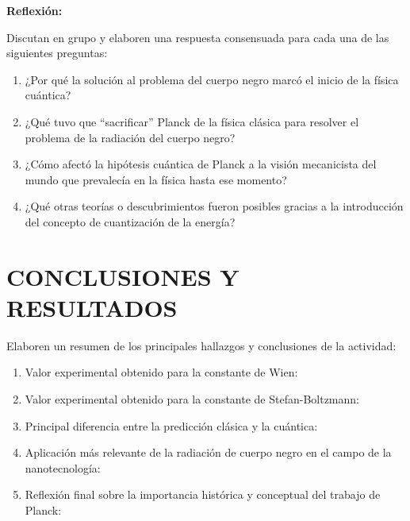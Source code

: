 \documentclass[12pt,a4paper]{article}
\begin{document}
	\begin{reflexionbox}
		\textbf{Reflexión:}
		
		Discutan en grupo y elaboren una respuesta consensuada para cada una de las siguientes preguntas:
		
		\begin{enumerate}
			\item ¿Por qué la solución al problema del cuerpo negro marcó el inicio de la física cuántica?
			
			\vspace{1.5cm}
			
			\item ¿Qué tuvo que ``sacrificar'' Planck de la física clásica para resolver el problema de la radiación del cuerpo negro?
			
			\vspace{1.5cm}
			
			\item ¿Cómo afectó la hipótesis cuántica de Planck a la visión mecanicista del mundo que prevalecía en la física hasta ese momento?
			
			\vspace{1.5cm}
			
			\item ¿Qué otras teorías o descubrimientos fueron posibles gracias a la introducción del concepto de cuantización de la energía?
			
			\vspace{1.5cm}
		\end{enumerate}
	\end{reflexionbox}
	
	\section*{CONCLUSIONES Y RESULTADOS}
	
	Elaboren un resumen de los principales hallazgos y conclusiones de la actividad:
	
	\begin{enumerate}
		\item Valor experimental obtenido para la constante de Wien: \hrulefill
		\item Valor experimental obtenido para la constante de Stefan-Boltzmann: \hrulefill
		\item Principal diferencia entre la predicción clásica y la cuántica: \hrulefill
		\item Aplicación más relevante de la radiación de cuerpo negro en el campo de la nanotecnología: \hrulefill
		\item Reflexión final sobre la importancia histórica y conceptual del trabajo de Planck: 
		
		\vspace{2cm}
	\end{enumerate}
	
\end{document}
